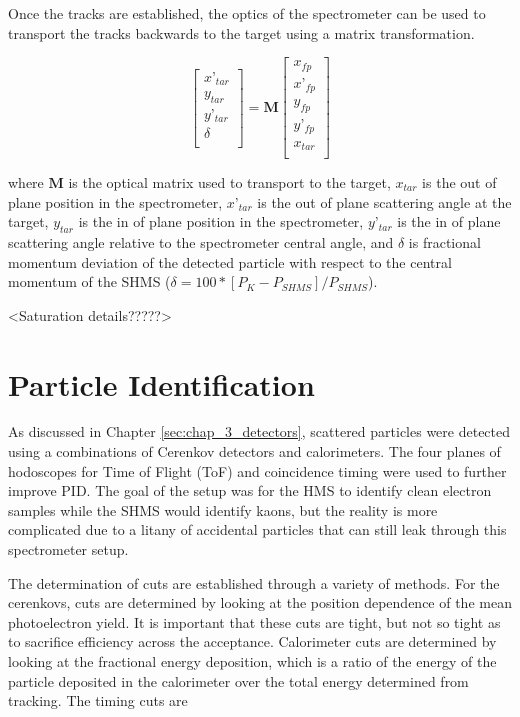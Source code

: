 \documentclass[
]{report}
\begin{document}
Once the tracks are established, the optics of the spectrometer can be
used to transport the tracks backwards to the target using a matrix
transformation.

\begin{equation} 
  \begin{bmatrix}
    x’_{tar} \\
    y_{tar} \\
    y’_{tar} \\
    \delta \\
  \end{bmatrix}=\textbf{M}  \begin{bmatrix}
    x_{fp} \\
    x’_{fp} \\
    y_{fp} \\
    y’_{fp} \\
    x_{tar} \\
  \end{bmatrix}
  \label{eq:fp_transform} 
\end{equation}

\noindent where \(\textbf{M}\) is the optical matrix used to transport
to the target, \(x_{tar}\) is the out of plane position in the
spectrometer, \(x’_{tar}\) is the out of plane scattering angle at the
target, \(y_{tar}\) is the in of plane position in the spectrometer,
\(y’_{tar}\) is the in of plane scattering angle relative to the
spectrometer central angle, and \(\delta\) is fractional momentum
deviation of the detected particle with respect to the central momentum
of the SHMS (\(\delta=100*[P_{K}-P_{SHMS}]/P_{SHMS}\)).

\textless Saturation details?????\textgreater{}

\hypertarget{Section-5.3}{%
\section{Particle Identification}\label{Section-5.3}}

As discussed in Chapter \ref{sec:chap_3_detectors}, scattered particles
were detected using a combinations of Cerenkov detectors and
calorimeters. The four planes of hodoscopes for Time of Flight (ToF) and
coincidence timing were used to further improve PID. The goal of the
setup was for the HMS to identify clean electron samples while the SHMS
would identify kaons, but the reality is more complicated due to a
litany of accidental particles that can still leak through this
spectrometer setup.

The determination of cuts are established through a variety of methods.
For the cerenkovs, cuts are determined by looking at the position
dependence of the mean photoelectron yield. It is important that these
cuts are tight, but not so tight as to sacrifice efficiency across the
acceptance. Calorimeter cuts are determined by looking at the fractional
energy deposition, which is a ratio of the energy of the particle
deposited in the calorimeter over the total energy determined from
tracking. The timing cuts are
\end{document}
